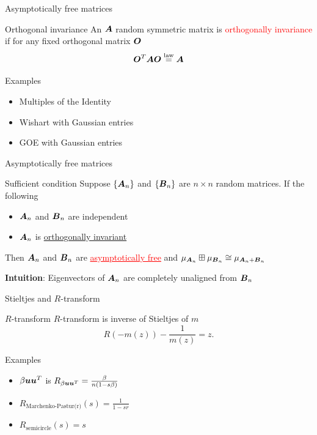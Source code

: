 \documentclass[10pt]{beamer}
\begin{document}
\begin{frame}{Asymptotically free matrices}
\begin{exampleblock}{Orthogonal invariance} An $\AA$ random symmetric matrix is \textcolor{red}{orthogonally invariance} if for any fixed orthogonal matrix $\OO$
\[ \OO^T \AA \OO \overset{\text{law}}{=} \AA  \]
\end{exampleblock}

\begin{alertblock}{Examples}
\begin{itemize}
    \item Multiples of the Identity
    \item Wishart with Gaussian entries
    \item GOE with Gaussian entries
\end{itemize}
\end{alertblock}
\end{frame}

\begin{frame}{Asymptotically free matrices}
    \begin{alertblock}{Sufficient condition} Suppose $\{\AA_n\}$ and $\{\BB_n\}$ are $n \times n$ random matrices. If the following
    \begin{itemize}
        \item $\AA_n$ and $\BB_n$ are independent
        \item $\AA_n$ is \underline{orthogonally invariant}
    \end{itemize}
    Then $\AA_n$ and $\BB_n$ are \textcolor{red}{\underline{asymptotically free}} and $\mu_{\AA_n} \boxplus \mu_{\BB_n} \cong \mu_{\AA_n + \BB_n}$
    \end{alertblock}
    \textbf{Intuition}: Eigenvectors of $\AA_n$ are completely unaligned from $\BB_n$
\end{frame}

\begin{frame}{Stieltjes and $R$-transform}
    \begin{alertblock}{$R$-transform} $R$-transform is inverse of Stieltjes of $m$
\[ R(-m(z)) -\frac{1}{m(z)} = z.\]
    \end{alertblock}

\begin{exampleblock}{Examples}
\begin{itemize}
    \item $\beta \uu \uu^T$ is $R_{\beta \uu \uu^T} = \frac{\beta}{n(1-s \beta)}$
    \item $R_{\text{Marchenko-Pastur(r)}}(s) = \frac{1}{1-sr}$ 
    \item $R_{\text{semicircle}}(s) = s$
\end{itemize}
\end{exampleblock}
\end{frame}
\end{document}
